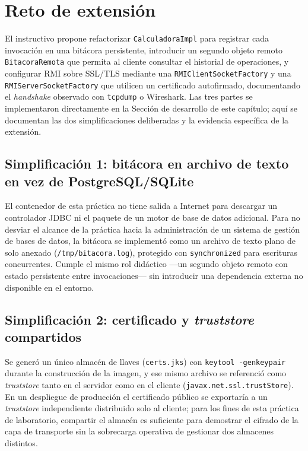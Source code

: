 \section{Reto de extensión}
\label{sec:p2-reto}

El instructivo propone refactorizar \texttt{CalculadoraImpl} para registrar cada invocación en una bitácora persistente, introducir un segundo objeto remoto \texttt{BitacoraRemota} que permita al cliente consultar el historial de operaciones, y configurar RMI sobre SSL/TLS mediante una \texttt{RMIClientSocketFactory} y una \texttt{RMIServerSocketFactory} que utilicen un certificado autofirmado, documentando el \emph{handshake} observado con \texttt{tcpdump} o Wireshark. Las tres partes se implementaron directamente en la Sección de desarrollo de este capítulo; aquí se documentan las dos simplificaciones deliberadas y la evidencia específica de la extensión.

\subsection*{Simplificación 1: bitácora en archivo de texto en vez de PostgreSQL/SQLite}

El contenedor de esta práctica no tiene salida a Internet para descargar un controlador JDBC ni el paquete de un motor de base de datos adicional. Para no desviar el alcance de la práctica hacia la administración de un sistema de gestión de bases de datos, la bitácora se implementó como un archivo de texto plano de solo anexado (\texttt{/tmp/bitacora.log}), protegido con \texttt{synchronized} para escrituras concurrentes. Cumple el mismo rol didáctico —un segundo objeto remoto con estado persistente entre invocaciones— sin introducir una dependencia externa no disponible en el entorno.

\subsection*{Simplificación 2: certificado y \emph{truststore} compartidos}

Se generó un único almacén de llaves (\texttt{certs.jks}) con \texttt{keytool -genkeypair} durante la construcción de la imagen, y ese mismo archivo se referenció como \emph{truststore} tanto en el servidor como en el cliente (\texttt{javax.net.ssl.trustStore}). En un despliegue de producción el certificado público se exportaría a un \emph{truststore} independiente distribuido solo al cliente; para los fines de esta práctica de laboratorio, compartir el almacén es suficiente para demostrar el cifrado de la capa de transporte sin la sobrecarga operativa de gestionar dos almacenes distintos.

